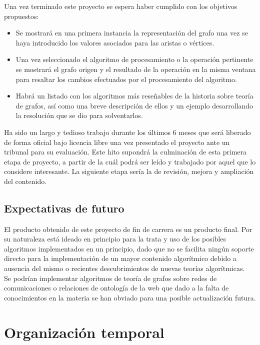 \documentclass[a4paper,12pt]{article}
\begin{document}
Una vez terminado este proyecto se espera haber cumplido con los objetivos propuestos:
\begin{itemize}
\item Se mostrará en una primera instancia la representación del grafo una vez se haya introducido los valores asociados para las aristas o vértices.

\item Una vez seleccionado el algoritmo de procesamiento o la operación pertinente se mostrará el grafo origen y el resultado de la operación en la misma ventana para resaltar los cambios efectuados por el procesamiento del algoritmo.

\item Habrá un listado con los algoritmos más reseñables de la historia sobre teoría de grafos, así como una breve descripción de ellos y un ejemplo desarrollando la resolución que se dio para solventarlos. 

\end{itemize}

Ha sido un largo y tedioso trabajo durante los últimos 6 meses que será liberado de forma oficial bajo licencia libre una vez presentado el proyecto ante un tribunal para su evaluación. Este hito supondrá la culminación de esta primera etapa de proyecto, a partir de la cuál podrá ser leído y trabajado por aquel que lo considere interesante. La siguiente etapa sería la de revisión, mejora y ampliación del contenido.\\

\subsection{Expectativas de futuro}

El producto obtenido de este proyecto de fin de carrera es un producto final. Por su naturaleza está ideado en principio para la trata y uso de los posibles algoritmos implementados en un principio, dado que no se facilita ningún soporte directo para la implementación de un mayor contenido algorítmico debido a ausencia del mismo o recientes descubrimientos de nuevas teorías algorítmicas.\\

Se podrían implementar algoritmos de teoría de grafos sobre redes de comunicaciones o relaciones de ontología de la web que dado a la falta de conocimientos en la materia se han obviado para una posible actualización futura.\\


\section{Organización temporal}
\end{document}
